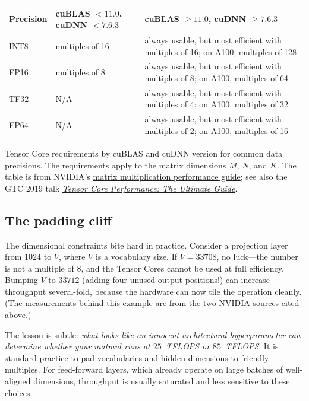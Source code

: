 \documentclass[11pt,a4paper]{article}
\theoremstyle{definition}
\theoremstyle{remark}
\theoremstyle{plain}
\begin{document}
\begin{center}
\renewcommand{\arraystretch}{1.25}
\begin{tabular}{@{}lp{3.3cm}p{7.3cm}@{}}
\toprule
\textbf{Precision} & \textbf{cuBLAS $<11.0$, cuDNN $<7.6.3$} &
\textbf{cuBLAS $\geq 11.0$, cuDNN $\geq 7.6.3$} \\
\midrule
INT8 & multiples of 16 &
  always usable, but most efficient with multiples of 16; on A100,
  multiples of 128 \\
FP16 & multiples of 8 &
  always usable, but most efficient with multiples of 8; on A100,
  multiples of 64 \\
TF32 & N/A &
  always usable, but most efficient with multiples of 4; on A100,
  multiples of 32 \\
FP64 & N/A &
  always usable, but most efficient with multiples of 2; on A100,
  multiples of 16 \\
\bottomrule
\end{tabular}
\par\smallskip
{\small Tensor Core requirements by cuBLAS and cuDNN version for common
data precisions. The requirements apply to the matrix dimensions $M$,
$N$, and $K$. The table is from NVIDIA's
\href{https://docs.nvidia.com/deeplearning/performance/dl-performance-matrix-multiplication/index.html\#requirements-tc}{matrix
multiplication performance guide}; see also the GTC 2019 talk
\href{https://developer.download.nvidia.com/video/gputechconf/gtc/2019/presentation/s9926-tensor-core-performance-the-ultimate-guide.pdf}{\textit{Tensor
Core Performance: The Ultimate Guide}}.}
\end{center}

\subsection{The padding cliff}

The dimensional constraints bite hard in practice. Consider a projection
layer from $1024$ to $V$, where $V$ is a vocabulary size. If $V = 33708$,
no luck---the number is not a multiple of $8$, and the Tensor Cores
cannot be used at full efficiency. Bumping $V$ to $33712$ (adding four
unused output positions!) can increase throughput several-fold, because
the hardware can now tile the operation cleanly. (The measurements behind
this example are from the two NVIDIA sources cited above.)

The lesson is subtle: \emph{what looks like an innocent architectural
hyperparameter can determine whether your matmul runs at $25$~TFLOPS or
$85$~TFLOPS}. It is standard practice to pad vocabularies and hidden
dimensions to friendly multiples. For feed-forward layers, which already
operate on large batches of well-aligned dimensions, throughput is
usually saturated and less sensitive to these choices.
\end{document}
